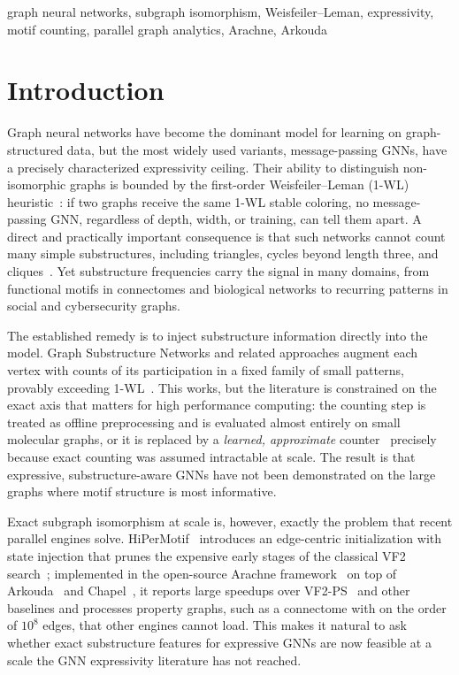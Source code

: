 \documentclass[conference]{IEEEtran}
\begin{document}
\begin{IEEEkeywords}
graph neural networks, subgraph isomorphism, Weisfeiler--Leman, expressivity,
motif counting, parallel graph analytics, Arachne, Arkouda
\end{IEEEkeywords}

\section{Introduction}
Graph neural networks have become the dominant model for learning on
graph-structured data, but the most widely used variants, message-passing GNNs,
have a precisely characterized expressivity ceiling. Their ability to distinguish
non-isomorphic graphs is bounded by the first-order Weisfeiler--Leman (1-WL)
heuristic~\cite{xu2019gin,morris2019}: if two graphs receive the same 1-WL stable
coloring, no message-passing GNN, regardless of depth, width, or training, can tell
them apart. A direct and practically important consequence is that such networks
cannot count many simple substructures, including triangles, cycles beyond length
three, and cliques~\cite{chen2020count}. Yet substructure frequencies carry the
signal in many domains, from functional motifs in connectomes and biological
networks to recurring patterns in social and cybersecurity graphs.

The established remedy is to inject substructure information directly into the
model. Graph Substructure Networks and related approaches augment each vertex with
counts of its participation in a fixed family of small patterns, provably exceeding
1-WL~\cite{bouritsas2022gsn}. This works, but the literature is constrained on the
exact axis that matters for high performance computing: the counting step is
treated as offline preprocessing and is evaluated almost entirely on small
molecular graphs, or it is replaced by a \emph{learned, approximate}
counter~\cite{fu2024desco} precisely because exact counting was assumed
intractable at scale. The result is that expressive, substructure-aware GNNs have
not been demonstrated on the large graphs where motif structure is most
informative.

Exact subgraph isomorphism at scale is, however, exactly the problem that recent
parallel engines solve. HiPerMotif~\cite{dindoost2025hipermotif} introduces an
edge-centric initialization with state injection that prunes the expensive early
stages of the classical VF2 search~\cite{cordella2004vf2}; implemented in the
open-source Arachne framework~\cite{rodriguez2022arachne} on top of
Arkouda~\cite{merrill2019arkouda} and Chapel~\cite{chamberlain2007chapel}, it
reports large speedups over VF2-PS~\cite{dindoost2024vf2ps} and other baselines and
processes property graphs, such as a connectome with on the order of $10^8$ edges,
that other engines cannot load. This makes it natural to ask whether exact
substructure features for expressive GNNs are now feasible at a scale the GNN
expressivity literature has not reached.
\end{document}
